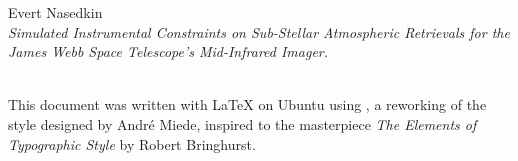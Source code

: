 
\thispagestyle{empty}

\hfill


\begin{center}
Evert Nasedkin \\
\smallskip
\textit{Simulated Instrumental Constraints on Sub-Stellar Atmospheric Retrievals for the James Webb Space Telescope's Mid-Infrared Imager.}\\
\smallskip
\end{center}

\medskip

\noindent\textsf{} \\
\noindent
This document was written with \LaTeX{} on Ubuntu using \arsclassica, a reworking of the \classicthesis{} style designed by Andr\'e Miede, inspired to the masterpiece \emph{The Elements of Typographic Style} by Robert Bringhurst. 

\bigskip

\noindent
\textsf{}

\noindent
{}\,